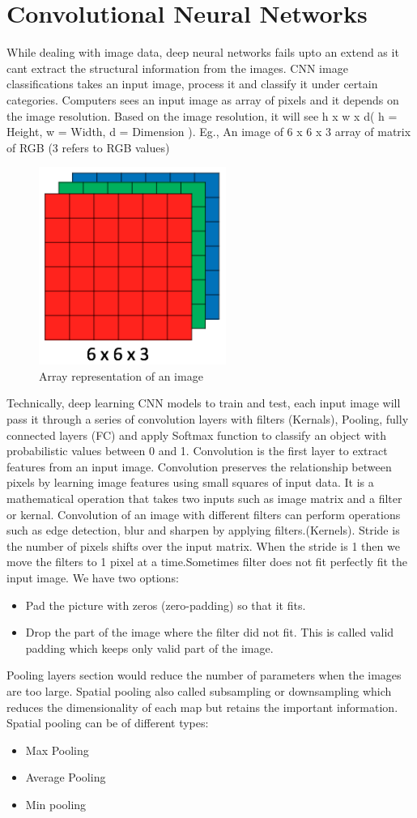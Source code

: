 \section{Convolutional Neural Networks}
    While dealing with image data, deep neural networks fails upto an extend as it cant extract the structural information from the images.  CNN image classifications takes an input image, process it and classify it under certain categories. Computers sees an input image as array of pixels and it depends on the image resolution. Based on the image resolution, it will see h x w x d( h = Height, w = Width, d = Dimension ). Eg., An image of 6 x 6 x 3 array of matrix of RGB (3 refers to RGB values) 
    \begin{figure}[h]
        \centering
        \includegraphics[width=0.2\linewidth]{matrix.png}
        \caption{Array representation of an image}
        \label{fig:Array representation of an image}
    \end{figure} 
    
    Technically, deep learning CNN models to train and test, each input image will pass it through a series of convolution layers with filters (Kernals), Pooling, fully connected layers (FC) and apply Softmax function to classify an object with probabilistic values between 0 and 1. 
    Convolution is the first layer to extract features from an input image. Convolution preserves the relationship between pixels by learning image features using small squares of input data. It is a mathematical operation that takes two inputs such as image matrix and a filter or kernal. Convolution of an image with different filters can perform operations such as edge detection, blur and sharpen by applying filters.(Kernels). Stride is the number of pixels shifts over the input matrix. When the stride is 1 then we move the filters to 1 pixel at a time.Sometimes filter does not fit perfectly fit the input image. We have two options:
        \begin{itemize}
            \item Pad the picture with zeros (zero-padding) so that it fits.
            \item Drop the part of the image where the filter did not fit. This is called valid padding which keeps only valid part of the image.
        \end{itemize}
     Pooling layers section would reduce the number of parameters when the images are too large. Spatial pooling also called subsampling or downsampling which reduces the dimensionality of each map but retains the important information. Spatial pooling can be of different types:
        \begin{itemize}
            \item Max Pooling
            \item Average Pooling
            \item Min pooling
        \end{itemize}

